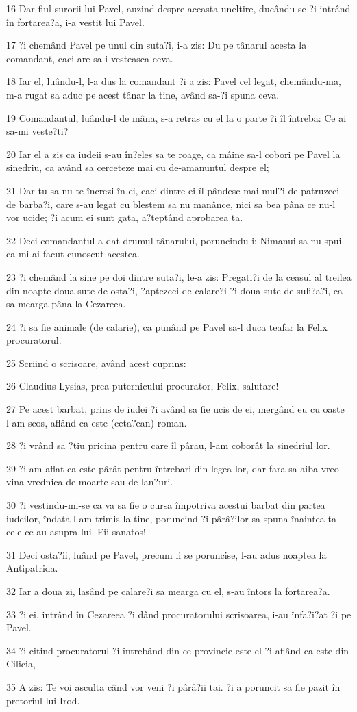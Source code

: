\par 16 Dar fiul surorii lui Pavel, auzind despre aceasta uneltire, ducându-se ?i intrând în fortarea?a, i-a vestit lui Pavel.
\par 17 ?i chemând Pavel pe unul din suta?i, i-a zis: Du pe tânarul acesta la comandant, caci are sa-i vesteasca ceva.
\par 18 Iar el, luându-l, l-a dus la comandant ?i a zis: Pavel cel legat, chemându-ma, m-a rugat sa aduc pe acest tânar la tine, având sa-?i spuna ceva.
\par 19 Comandantul, luându-l de mâna, s-a retras cu el la o parte ?i îl întreba: Ce ai sa-mi veste?ti?
\par 20 Iar el a zis ca iudeii s-au în?eles sa te roage, ca mâine sa-l cobori pe Pavel la sinedriu, ca având sa cerceteze mai cu de-amanuntul despre el;
\par 21 Dar tu sa nu te încrezi în ei, caci dintre ei îl pândesc mai mul?i de patruzeci de barba?i, care s-au legat cu blestem sa nu manânce, nici sa bea pâna ce nu-l vor ucide; ?i acum ei sunt gata, a?teptând aprobarea ta.
\par 22 Deci comandantul a dat drumul tânarului, poruncindu-i: Nimanui sa nu spui ca mi-ai facut cunoscut acestea.
\par 23 ?i chemând la sine pe doi dintre suta?i, le-a zis: Pregati?i de la ceasul al treilea din noapte doua sute de osta?i, ?aptezeci de calare?i ?i doua sute de suli?a?i, ca sa mearga pâna la Cezareea.
\par 24 ?i sa fie animale (de calarie), ca punând pe Pavel sa-l duca teafar la Felix procuratorul.
\par 25 Scriind o scrisoare, având acest cuprins:
\par 26 Claudius Lysias, prea puternicului procurator, Felix, salutare!
\par 27 Pe acest barbat, prins de iudei ?i având sa fie ucis de ei, mergând eu cu oaste l-am scos, aflând ca este (ceta?ean) roman.
\par 28 ?i vrând sa ?tiu pricina pentru care îl pârau, l-am coborât la sinedriul lor.
\par 29 ?i am aflat ca este pârât pentru întrebari din legea lor, dar fara sa aiba vreo vina vrednica de moarte sau de lan?uri.
\par 30 ?i vestindu-mi-se ca va sa fie o cursa împotriva acestui barbat din partea iudeilor, îndata l-am trimis la tine, poruncind ?i pârâ?ilor sa spuna înaintea ta cele ce au asupra lui. Fii sanatos!
\par 31 Deci osta?ii, luând pe Pavel, precum li se poruncise, l-au adus noaptea la Antipatrida.
\par 32 Iar a doua zi, lasând pe calare?i sa mearga cu el, s-au întors la fortarea?a.
\par 33 ?i ei, intrând în Cezareea ?i dând procuratorului scrisoarea, i-au înfa?i?at ?i pe Pavel.
\par 34 ?i citind procuratorul ?i întrebând din ce provincie este el ?i aflând ca este din Cilicia,
\par 35 A zis: Te voi asculta când vor veni ?i pârâ?ii tai. ?i a poruncit sa fie pazit în pretoriul lui Irod.

